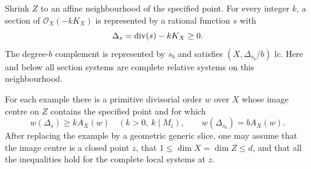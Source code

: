 Shrink $Z$ to an affine neighbourhood of the specified point.  For every
integer $k$, a section of $\mathcal O_X(-kK_X)$ is represented by a
rational function $s$ with
\begin{equation}\label{eq:H-section-divisor}
 \Delta_s=\operatorname{div}(s)-kK_X\ge0.
\end{equation}
The degree-$b$ complement is represented by $s_b$ and satisfies
$(X,\Delta_{s_b}/b)$ lc.  Here and below all section systems are complete
relative systems on this neighbourhood.

\begin{proposition}\label{prop:H-saturation}
For each example there is a primitive divisorial order $w$ over $X$ whose
image centre on $Z$ contains the specified point and for which
\begin{equation}\label{eq:H-saturation}
 w(\Delta_s)\ge k A_X(w)\quad
       (k>0,\ k\mid M_i),\qquad
 w(\Delta_{s_b})=bA_X(w).
\end{equation}
After replacing the example by a geometric generic slice, one may assume
that the image centre is a closed point $z$, that
$1\le\dim X=\dim Z\le d$, and that all the inequalities hold for the
complete local systems at $z$.
\end{proposition}
